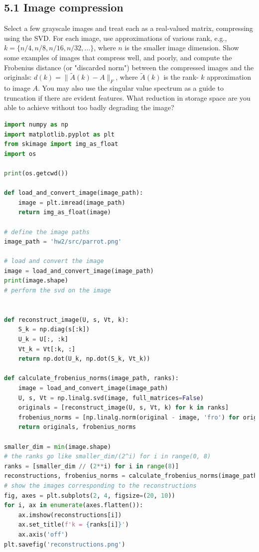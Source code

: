 \documentclass[12pt]{article}
\begin{document}
\subsection*{5.1 Image compression}
Select a few grayscale images and treat each as a real-valued matrix, compressing using the SVD. For each image, use approximations of various rank, e.g., $k=\{n / 4, n / 8, n / 16, n / 32, \ldots\}$, where $n$ is the smaller image dimension. Show some examples of images that compress well, and poorly, and compute the Frobenius distance (or "discarded norm") between the compressed images and the originals: $d(k)=\|\tilde{A}(k)-A\|_{F}$, where $\tilde{A}(k)$ is the rank- $k$ approximation to image $A$. You may also use the singular value spectrum as a guide to truncation if there are evident features. What reduction in storage space are you able to achieve without too badly degrading the image?
\newpage
\begin{lstlisting}[language=Python]
import numpy as np
import matplotlib.pyplot as plt
from skimage import img_as_float
import os

print(os.getcwd())

def load_and_convert_image(image_path):
    image = plt.imread(image_path)
    return img_as_float(image)

# define the image paths
image_path = 'hw2/src/parrot.png'

# load and convert the image
image = load_and_convert_image(image_path)
print(image.shape)
# perform the svd on the image


def reconstruct_image(U, s, Vt, k):
    S_k = np.diag(s[:k])
    U_k = U[:, :k]
    Vt_k = Vt[:k, :]
    return np.dot(U_k, np.dot(S_k, Vt_k))

def calculate_frobenius_norms(image_path, ranks):
    image = load_and_convert_image(image_path)
    U, s, Vt = np.linalg.svd(image, full_matrices=False)
    originals = [reconstruct_image(U, s, Vt, k) for k in ranks]
    frobenius_norms = [np.linalg.norm(original - image, 'fro') for original in originals]
    return originals, frobenius_norms

smaller_dim = min(image.shape)
# the ranks go like smaller_dim/(2^i) for i in range(0, 8)
ranks = [smaller_dim // (2**i) for i in range(8)]
reconstructions, frobenius_norms = calculate_frobenius_norms(image_path, ranks)
# show the images corresponding to the reconstructions
fig, axes = plt.subplots(2, 4, figsize=(20, 10))
for i, ax in enumerate(axes.flatten()):
    ax.imshow(reconstructions[i])
    ax.set_title(f'k = {ranks[i]}')
    ax.axis('off')
plt.savefig('reconstructions.png')

\end{lstlisting}
\end{document}
